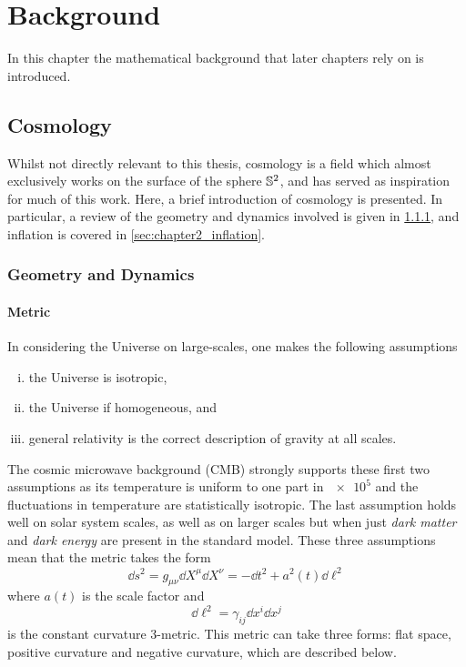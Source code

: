 \chapter{Background}\label{sec:chapter2}

In this chapter the mathematical background that later chapters rely on is introduced.

\section{Cosmology}

Whilst not directly relevant to this thesis, cosmology is a field which almost exclusively works on the surface of the sphere \(\mathbb{S}^{2}{}\), and has served as inspiration for much of this work.
Here, a brief introduction of cosmology is presented.
In particular, a review of the geometry and dynamics involved is given in \cref{sec:chapter2_geometry_dynamics}, and inflation is covered in \cref{sec:chapter2_inflation}.

\subsection{Geometry and Dynamics}\label{sec:chapter2_geometry_dynamics}

\subsubsection{Metric}

In considering the Universe on large-scales, one makes the following assumptions
%
\begin{enumerate}[(i),nosep,left=\parindent]
	\item the Universe is isotropic,
	\item the Universe if homogeneous, and
	\item general relativity is the correct description of gravity at all scales.
\end{enumerate}
%
The cosmic microwave background (CMB) strongly supports these first two assumptions as its temperature is uniform to one part in \(\num{e5}\) and the fluctuations in temperature are statistically isotropic.
The last assumption holds well on solar system scales, as well as on larger scales but when just \emph{dark matter} and \emph{dark energy} are present in the standard model.
These three assumptions mean that the metric takes the form
%
\begin{equation}\label{eq:chapter2_original_metric}
	\dd{s^{2}}
	= g_{\mu\nu} \dd{X^{\mu}} \dd{X^{\nu}}
	= -\dd{t^{2}} + a^{2}(t) \dd{\ell^{2}}
\end{equation}
%
where \(a(t)\) is the scale factor and
%
\begin{equation}
	\dd{\ell^{2}}
	= \gamma_{i j} \dd{x^{i}} \dd{x^{j}}
\end{equation}
%
is the constant curvature 3-metric.
This metric can take three forms: flat space, positive curvature and negative curvature, which are described below.

